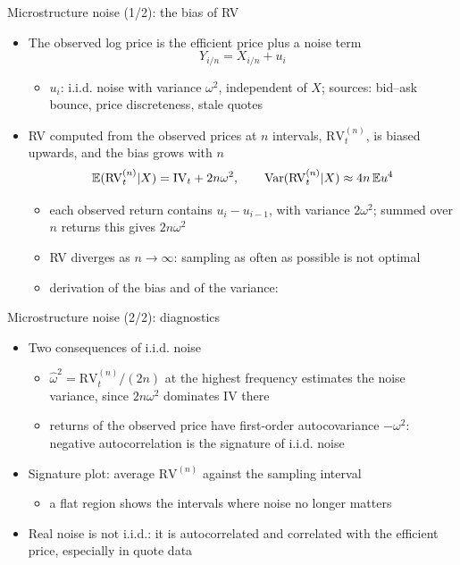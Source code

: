 \begin{frame}{Microstructure noise (1/2): the bias of RV}
\itemsize{\small}
\begin{itemize}
    \item \hypertarget{ch8noise}{}The observed log price is the efficient price plus a noise term
    \[ Y_{i/n} = X_{i/n} + u_i \]
    \begin{itemize}
        \item $u_i$: i.i.d. noise with variance $\omega^2$, independent of $X$; sources: bid--ask bounce, price discreteness, stale quotes
    \end{itemize}
    \item RV computed from the observed prices at $n$ intervals, $\mathrm{RV}^{(n)}_t$, is biased upwards, and the bias grows with $n$
    \[ \mathbb{E}(\mathrm{RV}^{(n)}_t | X) = \mathrm{IV}_t + 2n\omega^2, \qquad \text{Var}(\mathrm{RV}^{(n)}_t | X) \approx 4n\,\mathbb{E} u^4 \]
    \begin{itemize}
        \item each observed return contains $u_i - u_{i-1}$, with variance $2\omega^2$; summed over $n$ returns this gives $2n\omega^2$
        \item RV diverges as $n \to \infty$: sampling as often as possible is not optimal
        \item derivation of the bias and of the variance:   %
    \end{itemize}
\end{itemize}
\end{frame}

\begin{frame}{Microstructure noise (2/2): diagnostics}
\itemsize{\small}
\begin{itemize}
    \item Two consequences of i.i.d. noise
    \begin{itemize}
        \item $\hat\omega^2 = \mathrm{RV}^{(n)}_t/(2n)$ at the highest frequency estimates the noise variance, since $2n\omega^2$ dominates IV there
        \item returns of the observed price have first-order autocovariance $-\omega^2$: negative autocorrelation is the signature of i.i.d. noise
    \end{itemize}
    \item Signature plot: average $\mathrm{RV}^{(n)}$ against the sampling interval
    \begin{itemize}
        \item a flat region shows the intervals where noise no longer matters
    \end{itemize}
    \item Real noise is not i.i.d.: it is autocorrelated and correlated with the efficient price, especially in quote data 
\end{itemize}
\end{frame}

